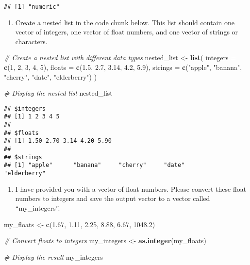 \documentclass[
]{article}
\newenvironment{Shaded}{\begin{snugshade}}{\end{snugshade}}
\newcommand{\AttributeTok}[1]{\textcolor[rgb]{0.13,0.29,0.53}{#1}}
\newcommand{\CommentTok}[1]{\textcolor[rgb]{0.56,0.35,0.01}{\textit{#1}}}
\newcommand{\DecValTok}[1]{\textcolor[rgb]{0.00,0.00,0.81}{#1}}
\newcommand{\FloatTok}[1]{\textcolor[rgb]{0.00,0.00,0.81}{#1}}
\newcommand{\FunctionTok}[1]{\textcolor[rgb]{0.13,0.29,0.53}{\textbf{#1}}}
\newcommand{\NormalTok}[1]{#1}
\newcommand{\OtherTok}[1]{\textcolor[rgb]{0.56,0.35,0.01}{#1}}
\newcommand{\StringTok}[1]{\textcolor[rgb]{0.31,0.60,0.02}{#1}}
\providecommand{\tightlist}{%
  \setlength{\itemsep}{0pt}\setlength{\parskip}{0pt}}
\begin{document}
\begin{verbatim}
## [1] "numeric"
\end{verbatim}

\begin{enumerate}
\def\labelenumi{\arabic{enumi})}
\setcounter{enumi}{1}
\tightlist
\item
  Create a nested list in the code chunk below. This list should contain
  one vector of integers, one vector of float numbers, and one vector of
  strings or characters.
\end{enumerate}

\begin{Shaded}
\begin{Highlighting}[]
\CommentTok{\# Create a nested list with different data types}
\NormalTok{nested\_list }\OtherTok{\textless{}{-}} \FunctionTok{list}\NormalTok{(}
    \AttributeTok{integers =} \FunctionTok{c}\NormalTok{(}\DecValTok{1}\NormalTok{, }\DecValTok{2}\NormalTok{, }\DecValTok{3}\NormalTok{, }\DecValTok{4}\NormalTok{, }\DecValTok{5}\NormalTok{),}
    \AttributeTok{floats =} \FunctionTok{c}\NormalTok{(}\FloatTok{1.5}\NormalTok{, }\FloatTok{2.7}\NormalTok{, }\FloatTok{3.14}\NormalTok{, }\FloatTok{4.2}\NormalTok{, }\FloatTok{5.9}\NormalTok{),}
    \AttributeTok{strings =} \FunctionTok{c}\NormalTok{(}\StringTok{"apple"}\NormalTok{, }\StringTok{"banana"}\NormalTok{, }\StringTok{"cherry"}\NormalTok{, }\StringTok{"date"}\NormalTok{, }\StringTok{"elderberry"}\NormalTok{)}
\NormalTok{)}

\CommentTok{\# Display the nested list}
\NormalTok{nested\_list}
\end{Highlighting}
\end{Shaded}

\begin{verbatim}
## $integers
## [1] 1 2 3 4 5
## 
## $floats
## [1] 1.50 2.70 3.14 4.20 5.90
## 
## $strings
## [1] "apple"      "banana"     "cherry"     "date"       "elderberry"
\end{verbatim}

\begin{enumerate}
\def\labelenumi{\arabic{enumi})}
\setcounter{enumi}{2}
\tightlist
\item
  I have provided you with a vector of float numbers. Please convert
  these float numbers to integers and save the output vector to a vector
  called ``my\_integers''.
\end{enumerate}

\begin{Shaded}
\begin{Highlighting}[]
\NormalTok{my\_floats }\OtherTok{\textless{}{-}} \FunctionTok{c}\NormalTok{(}\FloatTok{1.67}\NormalTok{, }\FloatTok{1.11}\NormalTok{, }\FloatTok{2.25}\NormalTok{, }\FloatTok{8.88}\NormalTok{, }\FloatTok{6.67}\NormalTok{, }\FloatTok{1048.2}\NormalTok{)}

\CommentTok{\# Convert floats to integers}
\NormalTok{my\_integers }\OtherTok{\textless{}{-}} \FunctionTok{as.integer}\NormalTok{(my\_floats)}

\CommentTok{\# Display the result}
\NormalTok{my\_integers}
\end{Highlighting}
\end{Shaded}
\end{document}
